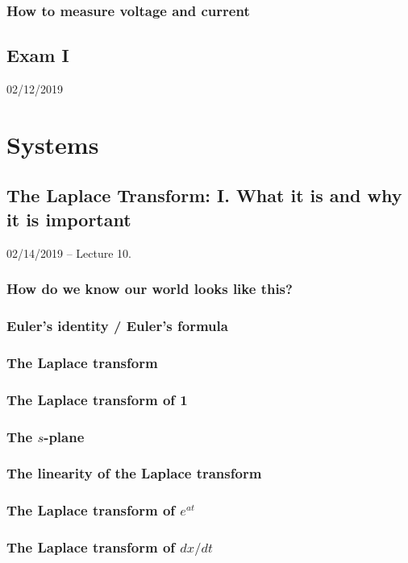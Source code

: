 \documentclass[11pt]{book}
\begin{document}
\section{How to measure voltage and current}

\chapter*{Exam I}
02/12/2019



\part{Systems}



\chapter{The Laplace Transform: I. What it is and why it is important}
02/14/2019 – Lecture 10. 
\section{How do we know our world looks like this?}
\section{Euler's identity / Euler's formula}
\section{The Laplace transform}
\section{The Laplace transform of 1}
\section{The $s$-plane}
\section{The linearity of the Laplace transform}
\section{The Laplace transform of $e^{at}$}
\section{The Laplace transform of $dx/dt$}
\end{document}
